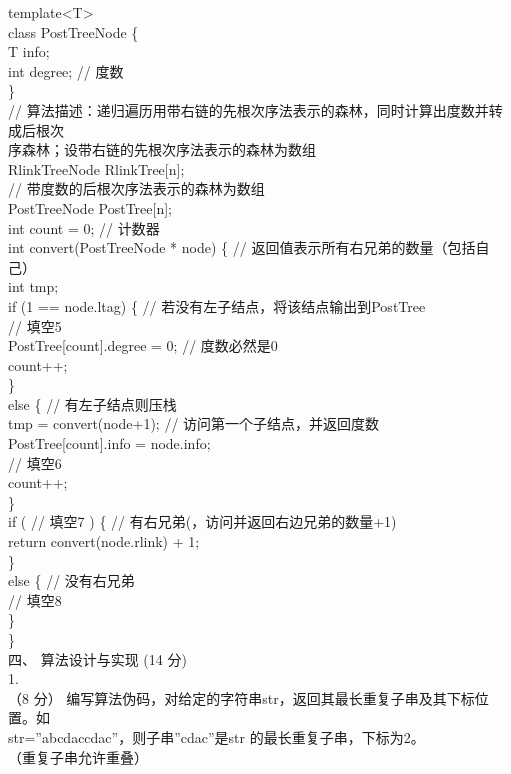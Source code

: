 \begin{question}
template<T>\\
class PostTreeNode \{\\
T info;\\
int degree;              // 度数\\
\}\\
// 算法描述：递归遍历用带右链的先根次序法表示的森林，同时计算出度数并转成后根次\\
序森林；设带右链的先根次序法表示的森林为数组\\
RlinkTreeNode RlinkTree[n];\\
// 带度数的后根次序法表示的森林为数组\\
PostTreeNode PostTree[n];\\
int count = 0;                      // 计数器\\
int convert(PostTreeNode * node) \{ // 返回值表示所有右兄弟的数量（包括自己）\\
int tmp;\\
if (1 == node.ltag) \{           // 若没有左子结点，将该结点输出到PostTree\\
// 填空5\\
PostTree[count].degree = 0; // 度数必然是0\\
count++;\\
\}\\
else \{                        // 有左子结点则压栈\\
tmp = convert(node+1);     // 访问第一个子结点，并返回度数\\
PostTree[count].info = node.info;\\
// 填空6\\
count++;\\
\}\\
if (       // 填空7         ) \{  // 有右兄弟(，访问并返回右边兄弟的数量+1)\\
return convert(node.rlink) + 1;\\
\}\\
else \{                       // 没有右兄弟\\
// 填空8\\
\}\\
\}\\
四、 算法设计与实现 (14 分)\\
1.\\
（8 分） 编写算法伪码，对给定的字符串str，返回其最长重复子串及其下标位置。如\\
str=”abcdaccdac”，则子串”cdac”是str 的最长重复子串，下标为2。\\
（重复子串允许重叠）\\

\end{question}
